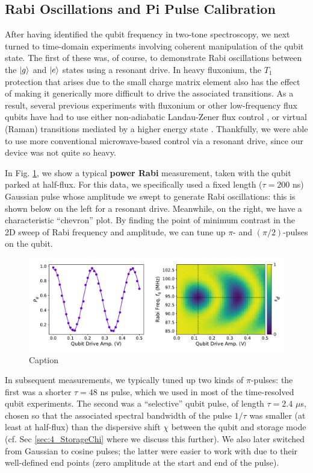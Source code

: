\subsection{Rabi Oscillations and Pi Pulse Calibration}

After having identified the qubit frequency in two-tone spectroscopy, we next turned to time-domain experiments involving coherent manipulation of the qubit state. The first of these was, of course, to demonstrate Rabi oscillations between the $\lvert g\rangle$ and $\lvert e\rangle$ states using a resonant drive. In heavy fluxonium, the $T_1$ protection that arises due to the small charge matrix element also has the effect of making it generically more difficult to drive the associated transitions. As a result, several previous experiments with fluxonium or other low-frequency flux qubits have had to use either non-adiabatic Landau-Zener flux control \cite{oliver2005mach, campbell2020universal, zhang2021universal}, or virtual (Raman) transitions mediated by a higher energy state \cite{earnest2018realization}. Thankfully, we were able to use more conventional microwave-based control via a resonant drive, since our device was not quite so heavy. 

In Fig. \ref{fig:4_rabi}, we show a typical \textbf{power Rabi} measurement, taken with the qubit parked at half-flux. For this data, we specifically used a fixed length ($\tau = 200$ ns) Gaussian pulse whose amplitude we swept to generate Rabi oscillations: this is shown below on the left for a resonant drive. Meanwhile, on the right, we have a characteristic ``chevron'' plot. By finding the point of minimum contrast in the 2D sweep of Rabi frequency and amplitude, we can tune up $\pi$- and $(\pi/2)$-pulses on the qubit. 

\begin{figure}[h]
    \centering
    \includegraphics[width=0.95\linewidth]{Figures/4/rabi.pdf}
    \caption{Caption}
    \label{fig:4_rabi}
\end{figure}

In subsequent measurements, we typically tuned up two kinds of $\pi$-pulses: the first was a shorter $\tau = 48$ ns pulse, which we used in most of the time-resolved qubit experiments. The second was a ``selective'' qubit pulse, of length $\tau = 2.4$ $\mu$s, chosen so that the associated spectral bandwidth of the pulse $1/\tau$ was smaller (at least at half-flux) than the dispersive shift $\chi$ between the qubit and storage mode (cf. Sec \ref{sec:4_StorageChi} where we discuss this further). We also later switched from Gaussian to cosine pulses; the latter were easier to work with due to their well-defined end points (zero amplitude at the start and end of the pulse). 

